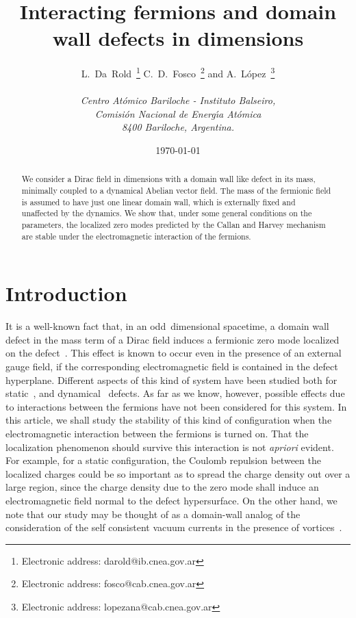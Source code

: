 \documentclass[a4paper,12pt]{article}
\begin{document}
\title{Interacting fermions and domain wall defects in \coordHE{}
  dimensions} \author{L.~Da~Rold~\footnote{Electronic address:
    darold@ib.cnea.gov.ar} C.~D.~Fosco~\footnote{Electronic address:
    fosco@cab.cnea.gov.ar} and A.~L{\'o}pez~\footnote{Electronic
    address: lopezana@cab.cnea.gov.ar}
  \\ \\
  {\normalsize\it {}\coordHE{}Centro At\' omico Bariloche - Instituto Balseiro,}\\
  {\normalsize\it Comisi{\'o}n Nacional de Energ\'{\i}a At{\'o}mica}\\
  {\normalsize\it 8400 Bariloche, Argentina.}}  \date{\today}
\maketitle
\begin{abstract}
\noindent We consider a Dirac field in \coordHE{} dimensions with a domain wall
like defect in its mass, minimally coupled to a dynamical Abelian
vector field.  The mass of the fermionic field is assumed to have just
one linear domain wall, which is externally fixed and unaffected by
the dynamics. We show that, under some general conditions on the
parameters, the localized zero modes predicted by the Callan and
Harvey mechanism are stable under the electromagnetic interaction of
the fermions.
\end{abstract}

\newpage
\section{Introduction}
It is a well-known fact that, in an odd~dimensional spacetime, a
domain wall defect in the mass term of a Dirac field induces a
fermionic zero mode localized on the defect~\cite{ch}.  This effect is
known to occur even in the presence of an external gauge field, if the
corresponding electromagnetic field is contained in the defect
hyperplane. Different aspects of this kind of system have been studied
both for static~\cite{p1,p2}, and dynamical~\cite{p3} defects. As far
as we know, however, possible effects due to interactions between the
fermions have not been considered for this system.  In this article,
we shall study the stability of this kind of configuration when the
electromagnetic interaction between the fermions is turned on.  That
the localization phenomenon should survive this interaction is not
{\em apriori\/} evident.  For example, for a static configuration, the
Coulomb repulsion between the localized charges could be so important
as to spread the charge density out over a large region, since the
charge density due to the zero mode shall induce an electromagnetic
field normal to the defect hypersurface.  On the other hand, we note
that our study may be thought of as a domain-wall analog of the
consideration of the self consistent vacuum currents in the presence
of vortices~\cite{li}. 
\end{document}
